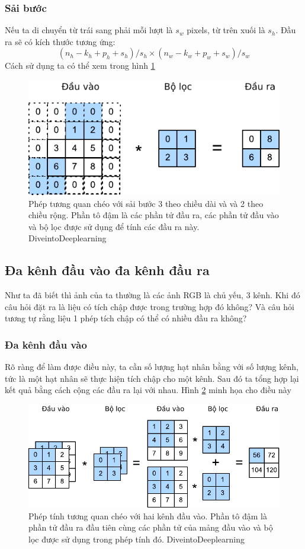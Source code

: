 \documentclass{article}
\begin{document}
\subsubsection{Sải bước}
Nếu ta di chuyển từ trái sang phải mỗi lượt là $s_w$ pixels, từ trên xuối là $s_h$. Đầu ra sẽ có kích thước tương ứng:
$$(n_h-k_h+p_h+s_h)/s_h\times(n_w-k_w+p_w+s_w)/s_w$$
Cách sử dụng ta có thể xem trong hình \ref{fig2}
\begin{figure}[ht!]
    \centering
    \includegraphics[width = 0.6\linewidth]{conv-stride.pdf}
    \caption{Phép tương quan chéo với sải bước 3 theo chiều dài và và 2 theo chiều rộng. Phần tô đậm là các phần tử đầu ra, các phần tử đầu vào và bộ lọc được sử dụng để tính các đầu ra này. DiveintoDeeplearning}
    \label{fig2}
\end{figure}
\subsection{Đa kênh đầu vào đa kênh đầu ra}
Như ta đã biết thì ảnh của ta thường là các ảnh RGB là chủ yếu, 3 kênh. Khi đó câu hỏi đặt ra là liệu có tích chập được trong trường hợp đó không? Và câu hỏi tương tự rằng liệu 1 phép tích chập có thể có nhiều đầu ra không?
\subsubsection{Đa kênh đầu vào}
Rõ ràng để làm được điều này, ta cần số lượng hạt nhân bằng với số lượng kênh, tức là một hạt nhân sẽ thực hiện tích chập cho một kênh. Sau đó ta tổng hợp lại kết quả bằng cách cộng các đầu ra lại với nhau. Hình \ref{fig3} minh họa cho điều này
\begin{figure}[ht!]
    \centering
    \includegraphics[width = 0.7\linewidth]{conv-multi-in.pdf}
    \caption{Phép tính tương quan chéo với hai kênh đầu vào. Phần tô đậm là phần tử đầu ra đầu tiên cùng các phần tử của mảng đầu vào và bộ lọc được sử dụng trong phép tính đó. DiveintoDeeplearning}
    \label{fig3}
\end{figure}
\end{document}
